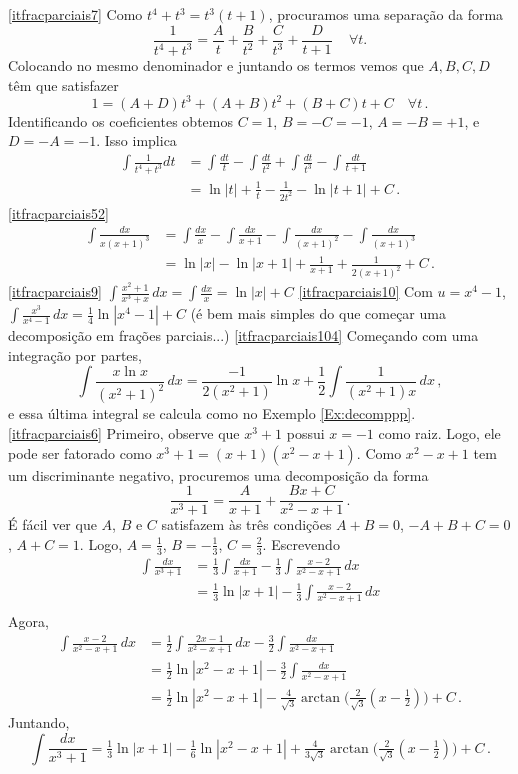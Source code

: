 \begin{Solution}{9.23}
\eqref{itfracparciais7}
Como $t^4+t^3=t^3(t+1)$, procuramos uma separação da forma
$$
\frac{1}{t^4+t^3}=\frac{A}{t}+\frac{B}{t^2}+\frac{C}{t^3}+\frac{D}{t+1}\,\quad
\forall t.
$$
Colocando no mesmo denominador e juntando os termos vemos que $A,B,C,D$ têm que
satisfazer
$$
1=(A+D)t^3+(A+B)t^2+(B+C)t+C\quad\forall t\,.
$$
Identificando os coeficientes obtemos $C=1$, $B=-C=-1$, $A=-B=+1$, e
$D=-A=-1$. Isso implica
\begin{align*}
\int \frac{1}{t^4+t^3}dt&=\int\frac{dt}{t}-\int \frac{dt}{t^2}+\int
\frac{dt}{t^3}-\int \frac{dt}{t+1}\\
&=\ln|t|+\frac{1}{t}-\frac{1}{2t^2}-\ln|t+1|+C\,.
\end{align*}
\eqref{itfracparciais52}
\begin{align*}
\int\frac{dx}{x(x+1)^3}
&=\int
\frac{dx}{x}-\int\frac{dx}{x+1}-\int\frac{dx}{(x+1)^2}-\int\frac{dx}{(x+1)^3}\\
&=\ln|x|-\ln|x+1|+\frac{1}{x+1}+\frac{1}{2(x+1)^2}+C\,.
\end{align*}
\eqref{itfracparciais9} $\int\frac{x^2+1}{x^3+x}\,dx=\int \frac{dx}{x}=\ln|x|+C$
\eqref{itfracparciais10} Com
$u=x^4-1$, $\int\frac{x^3}{x^4-1}\,dx=\tfrac14\ln|x^4-1|+C$ (é bem mais simples do que começar uma
decomposição em frações parciais...)
\eqref{itfracparciais104} Começando com uma integração por partes,
\[
\int \frac{x\ln x}{(x^2+1)^2}\,dx=\frac{-1}{2(x^2+1)}\ln x+\frac12\int
\frac{1}{(x^2+1)x}\,dx\,,
\]
e essa última integral se calcula como no Exemplo \ref{Ex:decomppp}.
\eqref{itfracparciais6} Primeiro, observe que $x^3+1$ possui $x=-1$ como raiz.
Logo, ele pode ser fatorado como $x^3+1=(x+1)(x^2-x+1)$.
Como $x^2-x+1$ tem um discriminante negativo,
procuremos uma decomposição da forma
$$
\frac{1}{x^3+1}=\frac{A}{x+1}+\frac{Bx+C}{x^2-x+1}\,.
$$
É fácil ver que $A$, $B$ e $C$ satisfazem às três condições $A+B=0$,
$-A+B+C=0$, $A+C=1$. Logo, $A=\frac13$, $B=-\frac13$, $C=\frac23$. Escrevendo
\begin{align*}
 \int\frac{dx}{x^3+1}&=\tfrac{1}{3}\int\frac{dx}{x+1}-\tfrac13\int
\frac{x-2}{x^2-x+1}\,dx\\
&=\tfrac{1}{3}\ln|x+1|-\tfrac13\int
\frac{x-2}{x^2-x+1}\,dx\\
\end{align*}
Agora,
\begin{align*}
\int \frac{x-2}{x^2-x+1}\,dx&=\tfrac12\int \frac{2x-1}{x^2-x+1}\,dx-\tfrac{3}{2}
\int\frac{dx}{x^2-x+1}\\
&=\tfrac12 \ln|x^2-x+1|-\tfrac{3}{2}
\int\frac{dx}{x^2-x+1}\\
&=\tfrac12 \ln|x^2-x+1|-\tfrac{4}{\sqrt{3}}\arctan\bigl(\tfrac{2}{\sqrt{3}}
(x-\tfrac12) \bigr)+C\,.
\end{align*}
Juntando,
$$
\int\frac{dx}{x^3+1}=\tfrac{1}{3}\ln|x+1|-\tfrac16\ln|x^2-x+1|+\tfrac{4}{3\sqrt{
3}}\arctan\bigl(\tfrac{2}{\sqrt{3}}(x-\tfrac12) \bigr)+C\,.
$$
\end{Solution}
